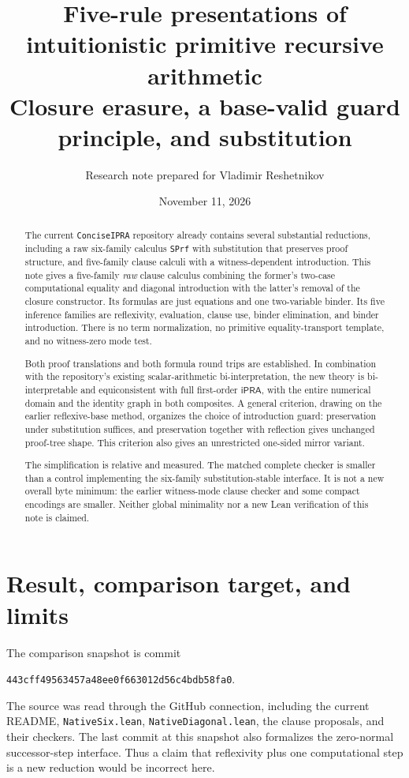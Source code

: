 \documentclass[11pt]{article}
\title{Five-rule presentations of intuitionistic primitive recursive arithmetic\\[4pt]\large Closure erasure, a base-valid guard principle, and substitution}
\author{Research note prepared for Vladimir Reshetnikov}
\date{November 11, 2026}
\theoremstyle{definition}\newtheorem{definition}[theorem]{Definition}
\theoremstyle{remark}\newtheorem{remark}[theorem]{Remark}
\newcommand{\ipra}{\ensuremath{\mathsf{iPRA}}}
\begin{document}
\maketitle
\begin{abstract}
The current \texttt{ConciseIPRA} repository already contains several substantial reductions, including a raw six-family calculus \texttt{SPrf} with substitution that preserves proof structure, and five-family clause calculi with a witness-dependent introduction. This note gives a five-family \emph{raw} clause calculus combining the former's two-case computational equality and diagonal introduction with the latter's removal of the closure constructor. Its formulas are just equations and one two-variable binder. Its five inference families are reflexivity, evaluation, clause use, binder elimination, and binder introduction. There is no term normalization, no primitive equality-transport template, and no witness-zero mode test.

Both proof translations and both formula round trips are established. In combination with the repository's existing scalar-arithmetic bi-interpretation, the new theory is bi-interpretable and equiconsistent with full first-order \ipra, with the entire numerical domain and the identity graph in both composites. A general criterion, drawing on the earlier reflexive-base method, organizes the choice of introduction guard: preservation under substitution suffices, and preservation together with reflection gives unchanged proof-tree shape. This criterion also gives an unrestricted one-sided mirror variant.

The simplification is relative and measured. The matched complete checker is smaller than a control implementing the six-family substitution-stable interface. It is not a new overall byte minimum: the earlier witness-mode clause checker and some compact encodings are smaller. Neither global minimality nor a new Lean verification of this note is claimed.
\end{abstract}
\clearpage
\tableofcontents
\clearpage

\section{Result, comparison target, and limits}

The comparison snapshot is commit
\begin{center}\texttt{443cff49563457a48ee0f663012d56c4bdb58fa0}.\end{center}
The source was read through the GitHub connection, including the current README, \texttt{NativeSix.lean}, \texttt{NativeDiagonal.lean}, the clause proposals, and their checkers. The last commit at this snapshot also formalizes the zero-normal successor-step interface. Thus a claim that reflexivity plus one computational step is a new reduction would be incorrect here.
\end{document}
